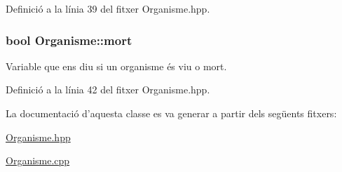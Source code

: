 Definició a la línia 39 del fitxer Organisme.\-hpp.

\hypertarget{class_organisme_ae20564db8d9ba5b7547750375010ed7b}{
\subsubsection[{mort}]{\setlength{\rightskip}{0pt plus 5cm}bool Organisme\-::mort\hspace{0.3cm}{\ttfamily [private]}}}\label{class_organisme_ae20564db8d9ba5b7547750375010ed7b}


Variable que ens diu si un organisme és viu o mort. 



Definició a la línia 42 del fitxer Organisme.\-hpp.



La documentació d'aquesta classe es va generar a partir dels següents fitxers\-:\begin{DoxyCompactItemize}
\item 
\hyperlink{_organisme_8hpp}{Organisme.\-hpp}\item 
\hyperlink{_organisme_8cpp}{Organisme.\-cpp}\end{DoxyCompactItemize}
